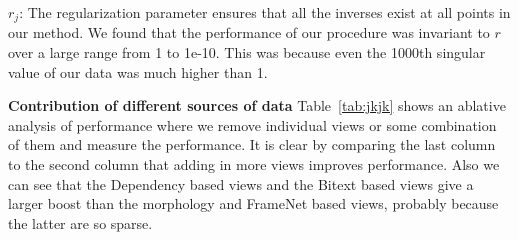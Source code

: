 \documentclass[11pt]{article}
\begin{document}
$r_j$: The regularization parameter ensures that all the
  inverses exist at all points in our method. We found that the
  performance of our  procedure was invariant to $r$ over a large
  range from 1 to 1e-10. This was because even the 1000th singular
  value of  our data was much higher than 1.

\noindent\textbf{Contribution of different sources of data}
 Table~\ref{tab:jkjk} shows an ablative analysis of performance where we
 remove individual views or some combination of them and measure the
 performance.  It is clear by comparing the last column to the second
 column that adding in more views
 improves performance. Also we can see that the Dependency based views and the Bitext
 based views give a larger boost than the morphology and FrameNet
 based views, probably because the latter are so sparse.
\end{document}
